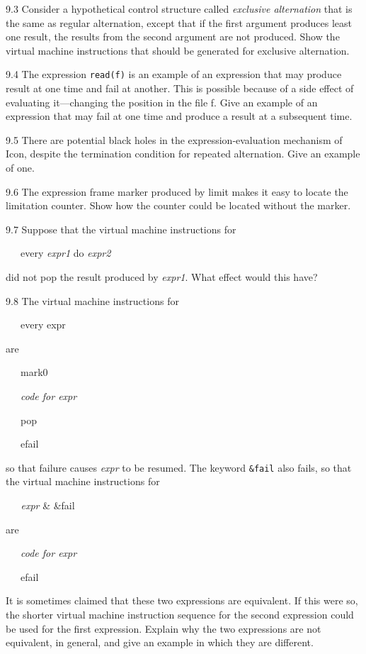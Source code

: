 9.3 Consider a hypothetical control structure called \textit{exclusive
alternation} that is the same as regular alternation, except that if
the first argument produces least one result, the results from the
second argument are not produced. Show the virtual machine
instructions that should be generated for exclusive alternation.

9.4 The expression \texttt{read(f)} is an example of an expression
that may produce result at one time and fail at another. This is
possible because of a side effect of evaluating it---changing the
position in the file f. Give an example of an expression that may fail
at one time and produce a result at a subsequent time.

9.5 There are potential {\textquotedbl}black holes{\textquotedbl} in
the expression-evaluation mechanism of Icon, despite the termination
condition for repeated alternation. Give an example of one.

9.6 The expression frame marker produced by limit makes it easy to
locate the limitation counter. Show how the counter could be located
without the marker.

9.7 Suppose that the virtual machine instructions for

{\ttfamily\mdseries
\ \ \ every \textit{expr1} do \textit{expr2}}

\noindent did not pop the result produced by \textit{expr1}. What
effect would this have?

9.8 The virtual machine instructions for

{\ttfamily\mdseries
\ \ \ every expr}

are

{\ttfamily\mdseries
\ \ \ mark0}

{\ttfamily\mdseries
\ \ \ \textit{code for expr}}

{\ttfamily\mdseries
\ \ \ pop}

{\ttfamily\mdseries
\ \ \ efail}

\noindent so that failure causes \textit{expr} to be resumed. The
keyword \texttt{\&fail} also fails, so that the virtual machine
instructions for

{\ttfamily\mdseries
\textit{\ \ \ expr }\& \&fail}

are

{\ttfamily\mdseries
\ \ \ \textit{code for expr}}

{\ttfamily\mdseries
\ \ \ efail}

It is sometimes claimed that these two expressions are equivalent. If
this were so, the shorter virtual machine instruction sequence for the
second expression could be used for the first expression. Explain why
the two expressions are not equivalent, in general, and give an
example in which they are different.

